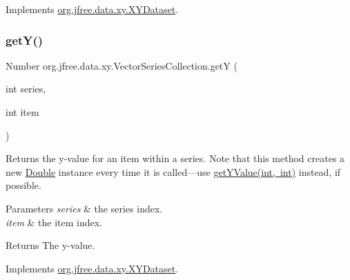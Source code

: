 Implements \mbox{\hyperlink{interfaceorg_1_1jfree_1_1data_1_1xy_1_1_x_y_dataset_a65bd212539d8f7dfb3d3d36b5f42e083}{org.\+jfree.\+data.\+xy.\+X\+Y\+Dataset}}.

\mbox{\label{classorg_1_1jfree_1_1data_1_1xy_1_1_vector_series_collection_a835b5143e64a99dff524840bba65ce5d}} 
\subsubsection{\texorpdfstring{get\+Y()}{getY()}}
{\footnotesize\ttfamily Number org.\+jfree.\+data.\+xy.\+Vector\+Series\+Collection.\+getY (\begin{DoxyParamCaption}\item[{int}]{series,  }\item[{int}]{item }\end{DoxyParamCaption})}

Returns the y-\/value for an item within a series. Note that this method creates a new \mbox{\hyperlink{}{Double}} instance every time it is called---use \mbox{\hyperlink{classorg_1_1jfree_1_1data_1_1xy_1_1_vector_series_collection_a418ee78010207ee552d5c2e74a031b31}{get\+Y\+Value(int, int)}} instead, if possible.


\begin{DoxyParams}{Parameters}
{\em series} & the series index. \\
\hline
{\em item} & the item index.\\
\hline
\end{DoxyParams}
\begin{DoxyReturn}{Returns}
The y-\/value. 
\end{DoxyReturn}


Implements \mbox{\hyperlink{interfaceorg_1_1jfree_1_1data_1_1xy_1_1_x_y_dataset_aa915867221e0f94021bad3140db5254e}{org.\+jfree.\+data.\+xy.\+X\+Y\+Dataset}}.

\mbox{\label{classorg_1_1jfree_1_1data_1_1xy_1_1_vector_series_collection_a418ee78010207ee552d5c2e74a031b31}} 
